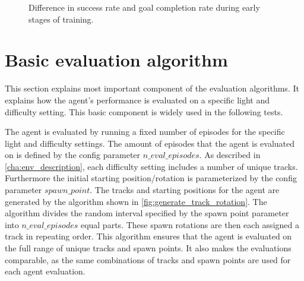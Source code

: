 \begin{figure}
    \centering
    \caption{Difference in success rate and goal completion rate during early stages of training.}
    \label{fig:success_rate_vs_goal_completion_rate}
\end{figure}


\section{Basic evaluation algorithm}
\label{sec:eval_model_track}

This section explains most important component of the evaluation algorithms. It explains how the agent's performance is evaluated on a specific light and difficulty setting. This basic component is widely used in the following tests.

The agent is evaluated by running a fixed number of episodes for the specific light and difficulty settings. The amount of episodes that the agent is evaluated on is defined by the config parameter $n\_eval\_episodes$. As described in \ref{cha:env_description}, each difficulty setting includes a number of unique tracks. Furthermore the initial starting position/rotation is parameterized by the config parameter $spawn\_point$.
The tracks and starting positions for the agent are generated by the algorithm shown in \ref{fig:generate_track_rotation}. The algorithm divides the random interval specified by the spawn point parameter into $n\_eval\_episodes$ equal parts. These spawn rotations are then each assigned a track in repeating order.
This algorithm ensures that the agent is evaluated on the full range of unique tracks and spawn points.
It also makes the evaluations comparable, as the same combinations of tracks and spawn points are used for each agent evaluation.

